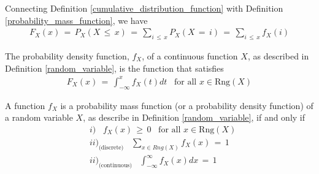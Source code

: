 \begin{note}
Connecting Definition \ref{cumulative_distribution_function} with Definition \ref{probability_mass_function}, we have
\begin{align*}
    F_{X}(x) \hspace{2pt} = \hspace{2pt} P_{X}(X \hspace{2pt} \leq \hspace{2pt} x) \hspace{2pt} = \hspace{2pt} \sum_{i \hspace{2pt} \leq \hspace{2pt} x} P_{X}(X \hspace{2pt} = \hspace{2pt} i) \hspace{2pt} = \hspace{2pt} \sum_{i \hspace{2pt} \leq \hspace{2pt} x} f_{X}(i)
\end{align*}
\end{note}

\begin{definition}
The probability density function, $f_{X}$, of a continuous function $X$, as described in Definition \ref{random_variable}, is the function that satisfies 
\begin{align*}
    F_{X}(x) \hspace{2pt} = \hspace{2pt} \int_{-\infty}^{x} f_{X}(t) dt \hspace{10pt} \text{for all} \hspace{4pt} x \in \text{Rng}(X)
\end{align*}
\end{definition}

\begin{theorem}
A function $f_{X}$ is a probability mass function (or a probability density function) of a random variable $X$, as describe in Definition \ref{random_variable}, if and only if
\begin{align*}
    &i) \hspace{10pt} f_{X}(x) \hspace{2pt} \geq \hspace{2pt} 0 \hspace{10pt} \text{for all} \hspace{4pt} x \in \text{Rng}(X)\\[2ex]
    &ii)_\text{(discrete)} \hspace{10pt} \sum_{x \in Rng(X)} f_{X}(x) \hspace{2pt} = \hspace{2pt} 1\\[2ex]
    &ii)_\text{(continuous)} \hspace{10pt} \int_{-\infty}^{\infty} f_{X}(x) dx \hspace{2pt} = \hspace{2pt} 1
\end{align*}
\end{theorem}

